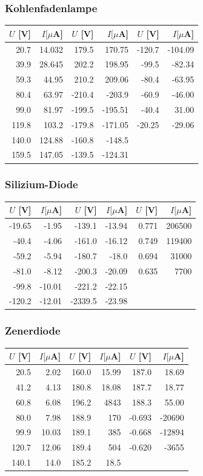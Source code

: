 \documentclass[12pt,a4paper]{article}
\begin{document}
\subsubsection*{Kohlenfadenlampe}
\begin{tabular}{|r|r|r|r|r|r|}
\hline
$U$ [V]&$I [\mu $A]&$U$ [V]&$I [\mu $A]&$U$ [V]&$I [\mu $A]\\
\hline
20.7&14.032&179.5&170.75&-120.7&-104.09\\
39.9&28.645&202.2&198.95&-99.5&-82.34\\
59.3&44.95&210.2&209.06&-80.4&-63.95\\
80.4&63.97&-210.4&-203.9&-60.9&-46.00\\
99.0&81.97&-199.5&-195.51&-40.4&31.00\\
119.8&103.2&-179.8&-171.05&-20.25&-29.06\\
140.0&124.88&-160.8&-148.5&&\\
159.5&147.05&-139.5&-124.31&&\\
\hline
\end{tabular}

\subsubsection*{Silizium-Diode}
\begin{tabular}{|r|r|r|r|r|r|}
\hline
$U$ [V]&$I [\mu $A]&$U$ [V]&$I [\mu $A]&$U$ [V]&$I [\mu $A]\\
\hline
-19.65&-1.95&-139.1&-13.94&0.771&206500\\
-40.4&-4.06&-161.0&-16.12&0.749&119400\\
-59.2&-5.94&-180.7&-18.0&0.694&31000\\
-81.0&-8.12&-200.3&-20.09&0.635&7700\\
-99.8&-10.01&-221.2&-22.15&&\\
-120.2&-12.01&-2339.5&-23.98&&\\
\hline
\end{tabular}

\subsubsection*{Zenerdiode}
\begin{tabular}{|r|r|r|r|r|r|}
\hline
$U$ [V]&$I [\mu $A]&$U$ [V]&$I [\mu $A]&$U$ [V]&$I [\mu $A]\\
\hline
20.5&2.02&160.0&15.99&187.0&18.69\\
41.2&4.13&180.8&18.08&187.7&18.77\\
60.8&6.08&196.2&4843&188.3&55.00\\
80.0&7.98&188.9&170&-0.693&-20690\\
99.9&10.03&189.1&385&-0.668&-12894\\
120.7&12.06&189.4&504&-0.620&-3655\\
140.1&14.0&185.2&18.5&&\\
\hline
\end{tabular}
\end{document}

